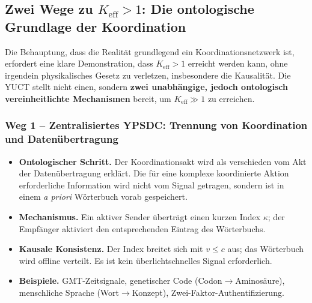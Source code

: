 \documentclass[12pt,a4paper]{article}
\begin{document}
	\subsection{Zwei Wege zu \(K_{\mathrm{eff}} > 1\): Die ontologische Grundlage der Koordination}
	\label{subsec:two-paths-ontology}
	
	Die Behauptung, dass die Realität grundlegend ein Koordinationsnetzwerk ist, erfordert
	eine klare Demonstration, dass \(K_{\mathrm{eff}} > 1\) erreicht werden kann, ohne
	irgendein physikalisches Gesetz zu verletzen, insbesondere die Kausalität. Die YUCT stellt nicht
	einen, sondern \textbf{zwei unabhängige, jedoch ontologisch vereinheitlichte Mechanismen} bereit, um
	\(K_{\mathrm{eff}} \gg 1\) zu erreichen.
	
	\subsubsection*{Weg 1 – Zentralisiertes YPSDC: Trennung von Koordination und Datenübertragung}
	\begin{itemize}[leftmargin=*]
		\item \textbf{Ontologischer Schritt.} Der Koordinationsakt wird als
		verschieden vom Akt der Datenübertragung erklärt. Die für eine
		komplexe koordinierte Aktion erforderliche Information wird nicht vom Signal getragen, sondern ist
		in einem \emph{a priori} Wörterbuch vorab gespeichert.
		\item \textbf{Mechanismus.} Ein aktiver Sender überträgt einen kurzen Index
		\(\kappa\); der Empfänger aktiviert den entsprechenden Eintrag des
		Wörterbuchs.
		\item \textbf{Kausale Konsistenz.} Der Index breitet sich mit \(v \le c\) aus;
		das Wörterbuch wird offline verteilt. Es ist kein überlichtschnelles Signal erforderlich.
		\item \textbf{Beispiele.} GMT-Zeitsignale, genetischer Code (Codon$\to$Aminosäure), menschliche Sprache (Wort$\to$Konzept), Zwei-Faktor-Authentifizierung.
	\end{itemize}
	
\end{document}

